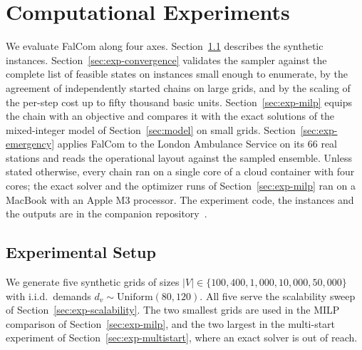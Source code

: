 \documentclass[preprint,12pt,authoryear]{elsarticle}
\theoremstyle{definition}
\begin{document}

\section{Computational Experiments}\label{sec:experiments}

We evaluate FalCom along four axes. Section~\ref{sec:setup} describes 
the synthetic instances. Section~\ref{sec:exp-convergence} validates 
the sampler against the complete list of feasible states on instances 
small enough to enumerate, by the agreement of independently started 
chains on large grids, and by the scaling of the per-step cost up to 
fifty thousand basic units. Section~\ref{sec:exp-milp} equips the chain 
with an objective and compares it with the exact solutions of the 
mixed-integer model of Section~\ref{sec:model} on small grids. 
Section~\ref{sec:exp-emergency} applies FalCom to the London Ambulance 
Service on its $66$ real stations and reads the operational layout against 
the sampled ensemble. Unless stated otherwise, every chain ran on a single core of a cloud container with four cores; the exact solver and the optimizer runs of Section~\ref{sec:exp-milp} ran on a MacBook with an Apple M3 processor. The experiment code, the instances and the outputs are in the companion repository~\citep{falcomchain}.

\FloatBarrier
\subsection{Experimental Setup}\label{sec:setup}
%
We generate five synthetic grids of sizes $|V| \in \{100, 400, 1{,}000, 10{,}000, 50{,}000\}$
with i.i.d.\ demands $d_v \sim \mathrm{Uniform}(80, 120)$.
All five serve the scalability sweep of Section~\ref{sec:exp-scalability}. 
The two smallest grids are used in the MILP comparison of Section~\ref{sec:exp-milp},
and the two largest in the multi-start experiment of Section~\ref{sec:exp-multistart}, 
where an exact solver is out of reach.
\end{document}
